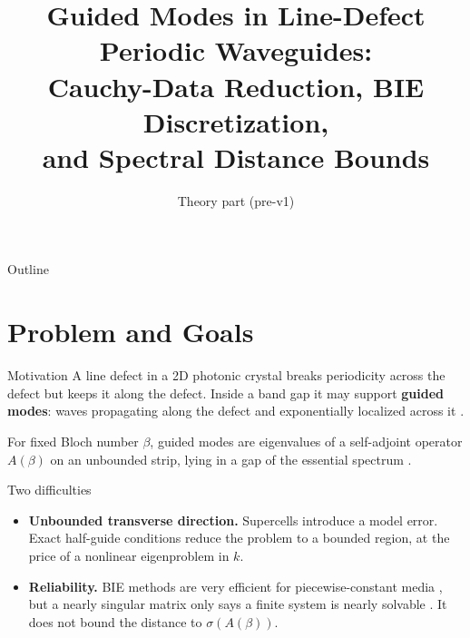 \documentclass[aspectratio=169]{beamer}
\title[Guided modes: BIE + spectral distance]{Guided Modes in Line-Defect Periodic Waveguides:\\
  Cauchy-Data Reduction, BIE Discretization,\\and Spectral Distance Bounds}
\subtitle{Theory part (pre-v1)}
\author{}
\date{}
\begin{document}
\begin{frame}
  \titlepage
\end{frame}

\begin{frame}{Outline}
  \tableofcontents
\end{frame}

\section{Problem and Goals}

\begin{frame}{Motivation}
  \small
  A line defect in a 2D photonic crystal breaks periodicity across the defect
  but keeps it along the defect. Inside a band gap it may support
  \textbf{guided modes}: waves propagating along the defect and exponentially
  localized across it \cite{JoannopoulosJohnsonWinnMeade2008}.

  \medskip
  For fixed Bloch number $\beta$, guided modes are eigenvalues of a
  self-adjoint operator $A(\beta)$ on an unbounded strip, lying in a gap of
  the essential spectrum \cite{Fliss2013}.

  \begin{block}{Two difficulties}
    \begin{itemize}
      \item \textbf{Unbounded transverse direction.} Supercells introduce a model
        error. Exact half-guide conditions
        \cite{JolyLiFliss2006,Fliss2013} reduce the problem to a bounded region,
        at the price of a nonlinear eigenproblem in $k$.
      \item \textbf{Reliability.} BIE methods are very efficient for
        piecewise-constant media
        \cite{Linton1998,BarnettGreengard2010,HaoBarnettMartinssonYoung2014}, but a
        nearly singular matrix only says a finite system is nearly solvable
        \cite{GuettelTisseur2017}. It does not bound the distance to
        $\sigma(A(\beta))$.
    \end{itemize}
  \end{block}
\end{frame}
\end{document}
